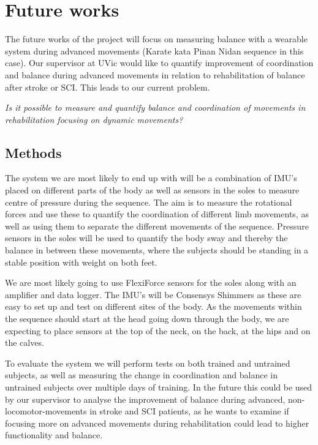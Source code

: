 \section{Future works}

The future works of the project will focus on measuring balance with a wearable system during advanced movements (Karate kata Pinan Nidan sequence in this case). Our supervisor at UVic would like to quantify improvement of coordination and balance during advanced movements in relation to rehabilitation of balance after stroke or SCI. This leads to our current problem. 
\begin{center}
\textit{Is it possible to measure and quantify balance and coordination of movements in rehabilitation focusing on dynamic movements?}
\end{center}
\subsection{Methods}

The system we are most likely to end up with will be a combination of IMU's placed on different parts of the body as well as sensors in the soles to measure centre of pressure during the sequence. The aim is to measure the rotational forces and use these to quantify the coordination of different limb movements, as well as using them to separate the different movements of the sequence. Pressure sensors in the soles will be used to quantify the body sway and thereby the balance in between these movements, where the subjects should be standing in a stable position with weight on both feet. 

We are most likely going to use FlexiForce sensors for the soles along with an amplifier and data logger. The IMU's will be Consensys Shimmers as these are easy to set up and test on different sites of the body. As the movements within the sequence should start at the head going down through the body, we are expecting to place sensors at the top of the neck, on the back, at the hips and on the calves. 

To evaluate the system we will perform tests on both trained and untrained subjects, as well as measuring the change in coordination and balance in untrained subjects over multiple days of training. In the future this could be used by our supervisor to analyse the improvement of balance during advanced, non-locomotor-movements in stroke and SCI patients, as he wants to examine if focusing more on advanced movements during rehabilitation could lead to higher functionality and balance. 